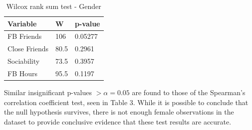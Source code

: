\begin{table}[H]
\centering
\caption{Wilcox rank sum test - Gender}
\begin{tabular}{l|l|l}
Variable      & W    & p-value \\ \hline
FB Friends    & 106  & 0.05277 \\ \hline
Close Friends & 80.5 & 0.2961  \\ \hline
Sociability   & 73.5 & 0.3957  \\ \hline
FB Hours      & 95.5 & 0.1197  \\ \hline
\end{tabular}
\end{table}

Similar insignificant p-values $> \alpha = 0.05$ are found to those of the Spearman's correlation coefficient test, seen in Table 3. While it is possible to conclude that the null hypothesis survives, there is not enough female observations in the dataset to provide conclusive evidence that these test results are accurate.
